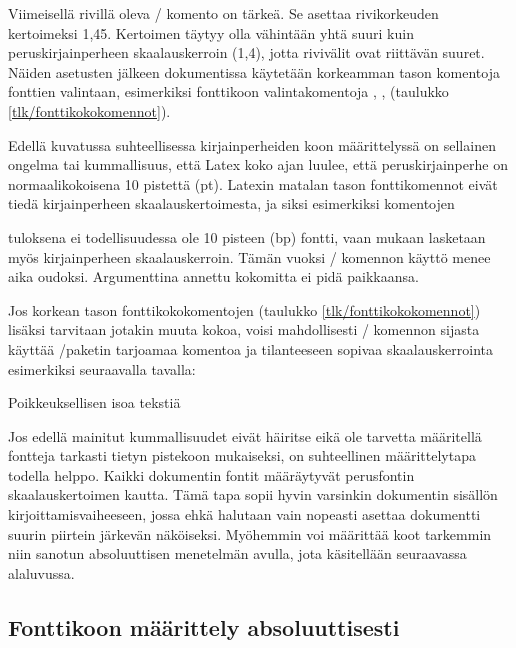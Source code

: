 Viimeisellä rivillä oleva \-/ komento on tärkeä. Se
asettaa rivikorkeuden kertoimeksi 1,45. Kertoimen täytyy olla vähintään
yhtä suuri kuin peruskirjainperheen skaalauskerroin (1,4), jotta
rivivälit ovat riittävän suuret. Näiden asetusten jälkeen dokumentissa
käytetään korkeamman tason komentoja fonttien valintaan, esimerkiksi
fonttikoon valintakomentoja , ,
 (taulukko \ref{tlk/fonttikokokomennot}).

Edellä kuvatussa suhteellisessa kirjainperheiden koon määrittelyssä on
sellainen ongelma tai kummallisuus, että Latex koko ajan luulee, että
peruskirjainperhe on normaalikokoisena 10 pistettä (pt). Latexin matalan
tason fonttikomennot eivät tiedä kirjainperheen skaalauskertoimesta, ja
siksi esimerkiksi komentojen

\begin{koodilohkosis}
\fontsize{10bp}{12bp} \selectfont
\end{koodilohkosis}

\noindent
tuloksena ei todellisuudessa ole 10 pisteen (bp) fontti, vaan mukaan
lasketaan myös kirjainperheen skaalauskerroin. Tämän vuoksi
\-/ komennon käyttö menee aika oudoksi. Argumenttina
annettu kokomitta ei pidä paikkaansa.

Jos korkean tason fonttikokokomentojen (taulukko
\ref{tlk/fonttikokokomennot}) lisäksi tarvitaan jotakin muuta kokoa,
voisi mahdollisesti \-/ komennon sijasta käyttää
\-/paketin tarjoamaa komentoa ja tilanteeseen sopivaa
skaalauskerrointa esimerkiksi seuraavalla tavalla:

\begin{koodilohkosis}
{ Poikkeuksellisen isoa tekstiä}
\end{koodilohkosis}

\noindent
Jos edellä mainitut kummallisuudet eivät häiritse eikä ole tarvetta
määritellä fontteja tarkasti tietyn pistekoon mukaiseksi, on
suhteellinen määrittelytapa todella helppo. Kaikki dokumentin fontit
määräytyvät perusfontin skaalauskertoimen kautta. Tämä tapa sopii hyvin
varsinkin dokumentin sisällön kirjoittamisvaiheeseen, jossa ehkä
halutaan vain nopeasti asettaa dokumentti suurin piirtein järkevän
näköiseksi. Myöhemmin voi määrittää koot tarkemmin niin sanotun
absoluuttisen menetelmän avulla, jota käsitellään seuraavassa
alaluvussa.

\subsection{Fonttikoon määrittely absoluuttisesti}
\label{luku/fontti-absoluuttinen}

